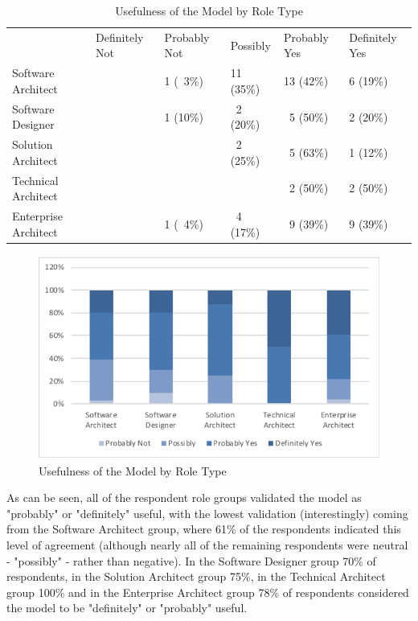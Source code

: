 \begin{table}
\caption{Usefulness of the Model by Role Type}
\label{table:usefulnessbyrole}
\footnotesize
\begin{tabular}{l P{1.5cm} P{1.5cm} P{1.5cm} P{1.5cm} P{1.5cm}}
 & Definitely Not & Probably Not & Possibly & Probably Yes & Definitely Yes \\
Software Architect	 &  &  1 (~3\%) & 11 (35\%)  & 13 (42\%) & 6 (19\%) \\
Software Designer    &  &  1 (10\%) &  ~2 (20\%) & ~5 (50\%) & 2 (20\%) \\
Solution Architect   &  &           &  ~2 (25\%) & ~5 (63\%) & 1 (12\%) \\
Technical Architect	 &  &           &            & ~2 (50\%) & 2 (50\%) \\
Enterprise Architect &  & 1 (~4\%)  & ~4 (17\%)  & ~9 (39\%) & 9 (39\%) \\
\end{tabular}
\end{table}

\begin{figure}[h]
\centering
\includegraphics[width=12cm,trim={2 2 2 2},clip]{Figures/prioritisation-usefulness-by-role}
\caption{Usefulness of the Model by Role Type}
\label{figure:usefulnessbyrole}
\end{figure}

As can be seen, all of the respondent role groups validated the model as "probably" or "definitely" useful, with the lowest validation (interestingly) coming from the Software Architect group, where 61\% of the respondents indicated this level of agreement (although nearly all of the remaining respondents were neutral - "possibly" - rather than negative).  In the Software Designer group 70\% of respondents, in the Solution Architect group 75\%, in the Technical Architect group 100\% and in the Enterprise Architect group 78\% of respondents considered the model to be "definitely" or "probably" useful.

